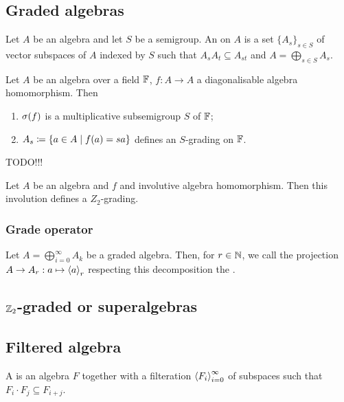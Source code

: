 \subsection{Graded algebras}
\begin{definition}
Let $A$ be an algebra and let $S$ be a semigroup. An  on $A$ is a set $\{A_s\}_{s\in S}$ of vector subspaces of $A$ indexed by $S$ such that $A_sA_t \subseteq A_{st}$ and $A = \bigoplus_{s\in S}A_s$.
\end{definition}


\begin{proposition}
Let $A$ be an algebra over a field $\mathbb{F}$, $f:A\to A$ a diagonalisable algebra homomorphism. Then
\begin{enumerate}
\item $\sigma(f)$ is a multiplicative subsemigroup $S$ of $\mathbb{F}$;
\item $A_s \coloneqq \left\{ a\in A \;\middle|\; f(a) = sa \right\}$ defines an $S$-grading on $\mathbb{F}$.
\end{enumerate}
\end{proposition}
TODO!!!

\begin{corollary}
Let $A$ be an algebra and $f$ and involutive algebra homomorphism. Then this involution defines a $Z_2$-grading.
\end{corollary}

\subsubsection{Grade operator}
\begin{definition}
Let $A = \bigoplus_{i=0}^\infty A_k$ be a graded algebra. Then, for $r\in \mathbb{N}$, we call the projection $A\to A_r: a\mapsto \left\langle a \right\rangle_r$ respecting this decomposition the .
\end{definition}

\subsection{$\mathbb{Z}_2$-graded or superalgebras}

\subsection{Filtered algebra}
\begin{definition}
A  is an algebra $F$ together with a filteration $\left\langle F_i \right\rangle_{i=0}^\infty$ of subspaces such that $F_i\cdot F_j \subseteq F_{i+j}$.
\end{definition}

